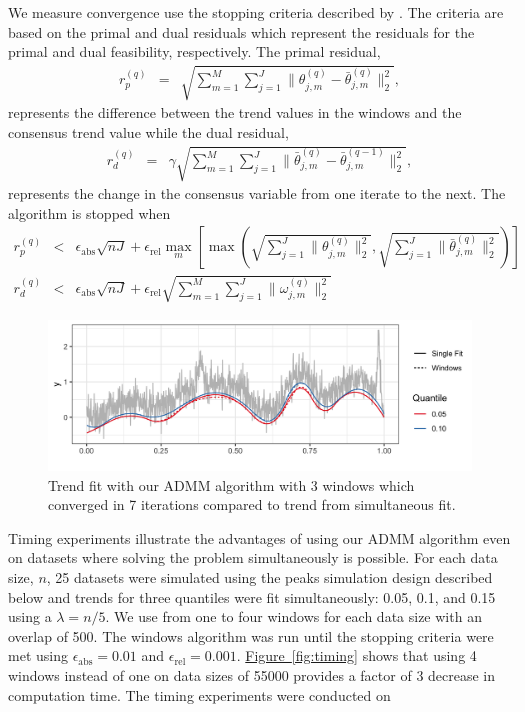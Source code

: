 \documentclass[12pt]{article}
\newcommand{\Fig}[1]{\hyperref[fig:#1]{Figure~\ref*{fig:#1}}} %
\newcommand{\Fig}[1]{{Figure~\ref{fig:#1}}} %
\begin{document}
	We measure convergence use the stopping criteria described by \cite{boyd2011distributed}. The criteria are based on the primal and dual residuals which represent the residuals for the primal and dual feasibility, respectively. The primal residual, 
	\begin{eqnarray*}
	r_p^{(q)} & = & \sqrt{\sum_{m=1}^M\sum_{j=1}^J\lVert\theta_{j,m}^{(q)} - \bar{\theta}_{j,m}^{(q)}\rVert_2^2},
	\end{eqnarray*}
	represents the difference between the trend values in the windows and the consensus trend value while the dual residual,
	\begin{eqnarray*}
	r_d^{(q)} & = & \gamma\sqrt{\sum_{m=1}^M \sum_{j=1}^J\lVert\bar{\theta}_{j,m}^{(q)} - \bar{\theta}_{j,m}^{(q-1)}\rVert_2^2},
	\end{eqnarray*}
	represents the change in the consensus variable from one iterate to the next. The algorithm is stopped when 
	\begin{eqnarray*}
		r_p^{(q)} & < &\epsilon_{\text{abs}}\sqrt{nJ} + \epsilon_{\text{rel}}\underset{m}{\max}\left[\max 
		\left(\sqrt{\sum_{j=1}^J \lVert\theta_{j,m}^{(q)}\rVert_2^2}, \sqrt{\sum_{j=1}^J \lVert \bar{\theta}_{j,m}^{(q)} \rVert_2^2} \right )\right]\\
		r_d^{(q)} & < & \epsilon_{\text{abs}}\sqrt{nJ} + \epsilon_{\text{rel}}\sqrt{\sum_{m=1}^M\sum_{j=1}^J\lVert \omega_{j,m}^{(q)}\rVert_2^2}
	\end{eqnarray*}
	

	
	\begin{figure}
		\centering
		\includegraphics[width = 0.8\linewidth]{Figures/admm_windows.png}
		\caption{Trend fit with our ADMM algorithm with 3 windows which converged in 7 iterations compared to trend from simultaneous fit.}
	\end{figure}

	Timing experiments illustrate the advantages of using our ADMM algorithm even on datasets where solving the problem simultaneously is possible. For each data size, $n$, 25 datasets were simulated using the peaks simulation design described below and trends for three quantiles were fit simultaneously: 0.05, 0.1, and 0.15 using a $\lambda = n/5$. We use from one to four windows for each data size with an overlap of 500. The windows algorithm was run until the stopping criteria were met using $\epsilon_{\text{abs}} = 0.01$ and $\epsilon_{\text{rel}} = 0.001$. \Fig{timing} shows that using 4 windows instead of one on data sizes of 55000 provides a factor of 3 decrease in computation time. The timing experiments were conducted on   
	
\end{document}
